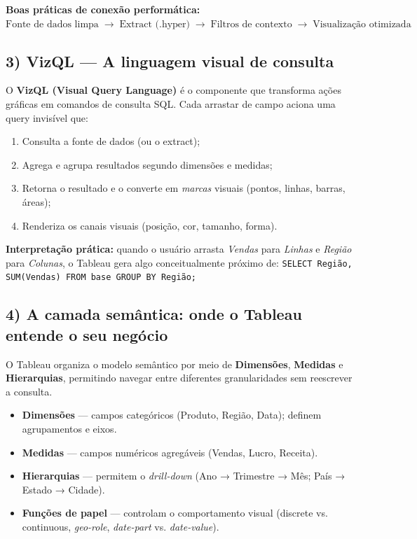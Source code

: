 \begin{FormulaBox}
\textbf{Boas práticas de conexão performática:}\\[4pt]
\(\text{Fonte de dados limpa} \;\rightarrow\; \text{Extract (.hyper)} \;\rightarrow\; \text{Filtros de contexto} \;\rightarrow\; \text{Visualização otimizada}\)
\end{FormulaBox}

\subsection*{3) VizQL — A linguagem visual de consulta}
O \textbf{VizQL (Visual Query Language)} é o componente que transforma ações gráficas em comandos de consulta SQL.  
Cada arrastar de campo aciona uma query invisível que:
\begin{enumerate}[leftmargin=*]
  \item Consulta a fonte de dados (ou o extract);
  \item Agrega e agrupa resultados segundo dimensões e medidas;
  \item Retorna o resultado e o converte em \textit{marcas} visuais (pontos, linhas, barras, áreas);
  \item Renderiza os canais visuais (posição, cor, tamanho, forma).
\end{enumerate}

\begin{NoteBox}
\textbf{Interpretação prática:} quando o usuário arrasta \textit{Vendas} para \textit{Linhas} e \textit{Região} para \textit{Colunas},  
o Tableau gera algo conceitualmente próximo de:  
\texttt{SELECT Região, SUM(Vendas) FROM base GROUP BY Região;}
\end{NoteBox}

\subsection*{4) A camada semântica: onde o Tableau entende o seu negócio}
O Tableau organiza o modelo semântico por meio de \textbf{Dimensões}, \textbf{Medidas} e \textbf{Hierarquias},  
permitindo navegar entre diferentes granularidades sem reescrever a consulta.

\begin{itemize}[leftmargin=*]
  \item \textbf{Dimensões} — campos categóricos (Produto, Região, Data); definem agrupamentos e eixos.  
  \item \textbf{Medidas} — campos numéricos agregáveis (Vendas, Lucro, Receita).  
  \item \textbf{Hierarquias} — permitem o \textit{drill-down} (Ano → Trimestre → Mês; País → Estado → Cidade).  
  \item \textbf{Funções de papel} — controlam o comportamento visual (discrete vs. continuous, \textit{geo-role}, \textit{date-part} vs. \textit{date-value}).
\end{itemize}

